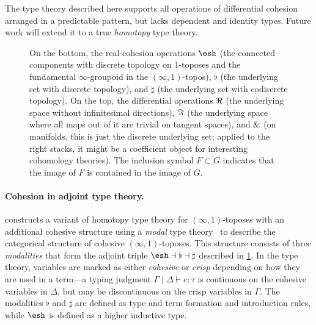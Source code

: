\documentclass{article}
\begin{document}
The type theory described here supports all operations of differential cohesion
arranged in a predictable pattern, but lacks dependent and identity types.
Future work will extend it to a true \emph{homotopy} type theory.

\begin{figure}
\begin{center}
\end{center}
\caption{On the bottom, the real-cohesion operations $\shape$ (the connected
  components with discrete topology on 1-toposes and the fundamental
  $\infty$-groupoid in the $(\infty,1)$-topos), $\flat$ (the underlying set with
  discrete topology), and $\sharp$ (the underlying set with codiscrete
  topology). On the top, the differential operations $\Re$ (the underlying
  space without infinitesimal directions), $\Im$ (the underlying space where
  all maps out of it are trivial on tangent spaces), and $\&$ (on manifolds,
  this is just the discrete underlying set; applied to the right stacks, it
  might be a coefficient object for interesting cohomology theories). The
  inclusion symbol $F \subset G$ indicates that the image of $F$ is contained in
  the image of $G$.}
\label{fig:modalities}
\end{figure}


\paragraph{Cohesion in adjoint type theory.}

\citet{Shulman2015} constructs a variant of homotopy type theory for
$(\infty,1)$-toposes with an additional cohesive structure using a \emph{modal}
type theory~\citep{Pfenning2001} to describe the categorical structure of
cohesive $(\infty,1)$-toposes. This structure consists of three
\emph{modalities} that form the adjoint triple
$\shape \dashv \flat \dashv \sharp$ described in
\cref{fig:modalities}. In the type theory, variables are marked as either
\emph{cohesive} or \emph{crisp} depending on how they are used in a term---a
typing judgment $\Gamma \mid \Delta \vdash e : \tau$ is continuous on the
cohesive variables in $\Delta$, but may be discontinuous on the crisp variables
in $\Gamma$. The modalities $\flat$ and $\sharp$ are defined as type and term
formation and introduction rules, while $\shape$ is defined as a higher
inductive type.
\end{document}
